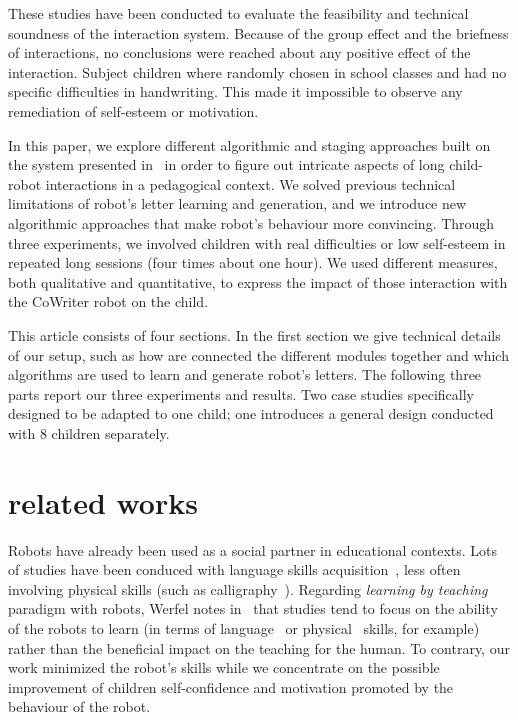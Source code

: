 \documentclass{sig-alternate}
\begin{document}
These studies have been conducted to evaluate the feasibility and technical soundness
of the interaction system. Because of the group effect and the briefness of
interactions, no conclusions were reached about any positive effect of the
interaction. Subject children where randomly chosen in school
classes and had no specific difficulties in handwriting. This made it
impossible to observe any remediation of self-esteem or motivation.

In this paper, we explore different algorithmic and staging approaches built on the system presented in~\cite{hood2015when} in order to figure out intricate aspects of long child-robot interactions in a pedagogical context. We solved previous 
technical limitations of robot's letter learning and generation, and we introduce new algorithmic approaches that make robot's behaviour more convincing.
Through three experiments, we involved children with real difficulties or low 
self-esteem in repeated long sessions (four times about one hour). We used different
measures, both qualitative and quantitative, to express the impact of those
interaction with the CoWriter robot on the child.

This article consists of four sections. In the first section we give technical details of our setup, such as how are connected the different modules
together and which algorithms are used to learn and generate robot's letters.
The following three parts report our three experiments and results. Two case studies specifically designed to be adapted to one child; one introduces a general design conducted with 8 children separately. 


\section{related works}

Robots have already been used as a social partner in educational
contexts. Lots of studies have been conduced with language skills
acquisition~\cite{han2010robot}, less often involving physical skills (such as
calligraphy~\cite{Matsui2013}). Regarding \textit{learning by teaching} paradigm with
robots, Werfel notes in~\cite{Werfel2014} that studies tend to focus on the
ability of the robots to learn (in terms of language~\cite{Saunders2010} or
physical~\cite{Mulling2013} skills, for example) rather than the beneficial impact
on the teaching for the human. To contrary, our work minimized the robot's skills while we
concentrate on the possible improvement of children self-confidence and
motivation promoted by the behaviour of the robot.
\end{document}

